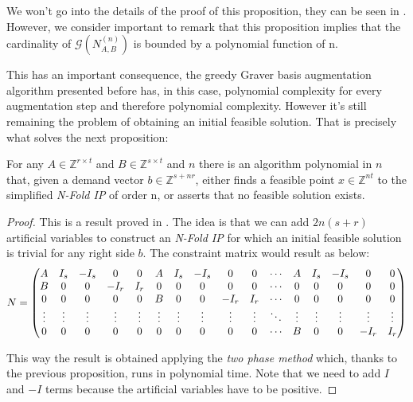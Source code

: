 We won't go into the details of the proof of this proposition, they can be seen in \cite[Theorem 4.2]{LHOW:2006}. However, we consider important to remark that this proposition implies that the cardinality of $\mathcal{G}(N_{A,B}^{(n)})$ is bounded by a polynomial function of n.

This has an important consequence, the greedy Graver basis augmentation algorithm presented before has, in this case, polynomial complexity for every augmentation step and therefore polynomial complexity. However it's still remaining the problem of obtaining an initial feasible solution. That is precisely what solves the next proposition:

\begin{lemma} \label{Nfold_two_phase}
For any $A \in \mathbb{Z}^{r \times t}$ and $B \in \mathbb{Z}^{s \times t}$ and $n$ there is an algorithm polynomial in $n$ that, given a  demand vector $b \in \mathbb{Z}^{s + nr}$, either finds a feasible point $x \in \mathbb{Z}^{nt}$ to the simplified \emph{N-Fold IP} of order n, or asserts that no feasible solution exists.
\end{lemma}
\vspace{-15pt} %
\begin{proof}
This is a result proved in \cite[Lemma 5.2]{LHOW:2006}. The idea is that we can add $2n(s+r)$ artificial variables to construct an \emph{N-Fold IP} for which an initial feasible solution is trivial for any right side $b$. The constraint matrix would result as below: 
\vspace{5pt}
\begin{equation*}
N = 
\setcounter{MaxMatrixCols}{20}
\begin{pmatrix}
A & I_s & -I_s & 0 & 0 & A & I_s & -I_s & 0 & 0 & \cdots & A & I_s & -I_s & 0 & 0 \\
B & 0 & 0 & -I_r & I_r & 0 & 0 & 0 & 0 & 0 & \cdots & 0 & 0 & 0 & 0 & 0 \\
0 & 0 & 0 & 0 & 0 & B & 0 & 0 & -I_r & I_r & \cdots & 0 & 0 & 0 & 0 & 0 \\
\vdots & \vdots & \vdots & \vdots & \vdots & \vdots & \vdots & \vdots & \vdots & \vdots & \ddots & \vdots & \vdots  & \vdots & \vdots & \vdots \\
0 & 0 & 0 & 0 & 0 & 0 & 0 & 0 & 0 & 0 & \cdots & B & 0 & 0 & -I_r & I_r 
\end{pmatrix}
\end{equation*}

This way the result is obtained applying the \textit{two phase method} which, thanks to the previous proposition, runs in polynomial time. Note that we need to add $I$ and $-I$ terms because the artificial variables have to be positive.
\vspace{5pt}
\end{proof}

